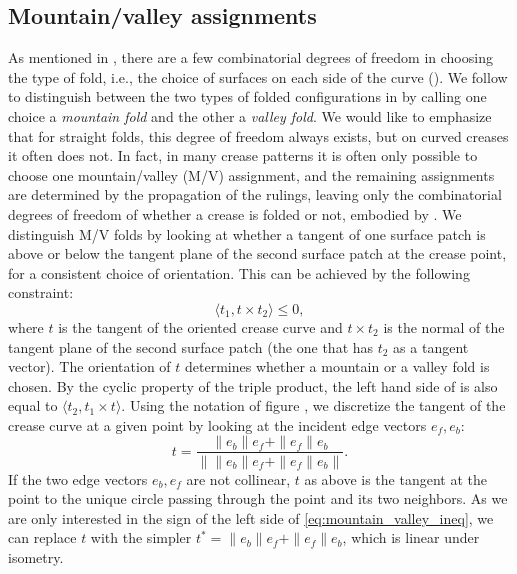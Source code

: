 \subsection{Mountain/valley assignments} 
As mentioned in , there are a few combinatorial degrees of freedom in choosing the type of fold, i.e., the choice of surfaces on each side of the curve (). We follow \cite{demaine_lens} to distinguish between the two types of folded configurations in  by calling one choice a \emph{mountain fold} and the other a \emph{valley fold}. We would like to emphasize that for straight folds, this degree of freedom always exists, but on curved creases it often does not. In fact, in many crease patterns it is often only possible to choose one mountain/valley (M/V) assignment, and the remaining assignments are determined by the propagation of the rulings, leaving only the combinatorial degrees of freedom of whether a crease is folded or not, embodied by . 
 We distinguish M/V folds by looking at whether a tangent of one surface patch is above or below the tangent plane of the second surface patch at the crease point, for a consistent choice of orientation. This can be achieved by the following constraint:
\begin{equation} \label{eq:mountain_valley_ineq}
\langle t_1, t \times t_2 \rangle \leq 0,
\end{equation}
where $t$ is the tangent of the oriented crease curve and $t \times t_2$ is the normal of the tangent plane of the second surface patch (the one that has $t_2$ as a tangent vector). The orientation of $t$ determines whether a mountain or a valley fold is chosen. By the cyclic property of the triple product, the left hand side of  is also equal to $\langle t_2, t_1 \times t \rangle$.
Using the notation of figure , we discretize the tangent of the crease curve at a given point by looking at the incident edge vectors $e_f, e_b$: 
$$t = \frac{\|e_b\|e_f + \|e_f\|e_b}{\left\|\|e_b\|e_f + \|e_f\|e_b\right\|}.$$
%
 If the two edge vectors $e_b, e_f$ are not collinear, $t$ as above is the tangent at the point to the unique circle passing through the point and its two neighbors. As we are only interested in the sign of the left side of \eqref{eq:mountain_valley_ineq}, we can replace $t$ with the simpler $t^* = \|e_b\|e_f + \|e_f\|e_b$, which is linear under isometry.
 
